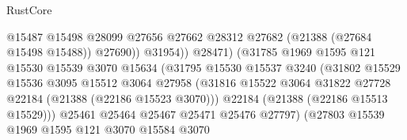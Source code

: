 \begin{lexlean}{RustCore}
\begin{coremodule}
                                              @15487
                                              @15498
                                              @28099
                                              @27656
                                              @27662
                                              @28312
                                              @27682
                                              (@21388 (@27684 @15498 @15488))
                                              @27690))
                                          @31954))
                                      @28471)
                                    (@31785
                                      @1969
                                      @1595
                                      @121
                                      @15530
                                      @15539
                                      @3070
                                      @15634
                                      (@31795
                                        @15530
                                        @15537
                                        @3240
                                        (@31802
                                          @15529
                                          @15536
                                          @3095
                                          @15512
                                          @3064
                                          @27958
                                          (@31816
                                            @15522
                                            @3064
                                            @31822
                                            @27728
                                            @22184
                                            (@21388 (@22186 @15523 @3070)))
                                          @22184
                                          (@21388 (@22186 @15513 @15529)))
                                        @25461
                                        @25464
                                        @25467
                                        @25471
                                        @25476
                                        @27797)
                                      (@27803
                                        @15539
                                        @1969
                                        @1595
                                        @121
                                        @3070
                                        @15584
                                        @3070

\end{coremodule}
\end{lexlean}
